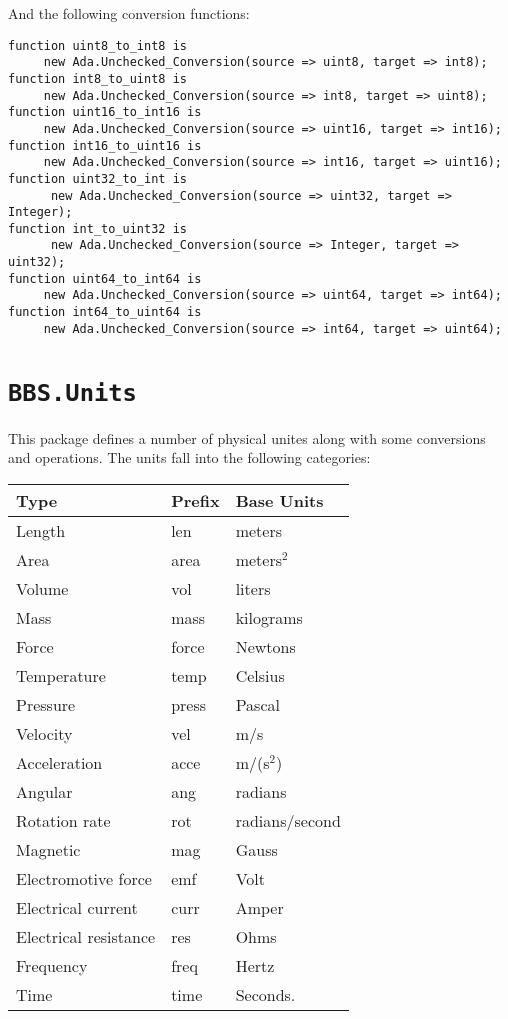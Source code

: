 \documentclass[10pt, openany]{book}
\newcommand{\package}[1]{\texttt{#1}}
\begin{document}
And the following conversion functions:
\begin{lstlisting}
function uint8_to_int8 is
     new Ada.Unchecked_Conversion(source => uint8, target => int8);
function int8_to_uint8 is
     new Ada.Unchecked_Conversion(source => int8, target => uint8);
function uint16_to_int16 is
     new Ada.Unchecked_Conversion(source => uint16, target => int16);
function int16_to_uint16 is
     new Ada.Unchecked_Conversion(source => int16, target => uint16);
function uint32_to_int is
      new Ada.Unchecked_Conversion(source => uint32, target => Integer);
function int_to_uint32 is
      new Ada.Unchecked_Conversion(source => Integer, target => uint32);
function uint64_to_int64 is
     new Ada.Unchecked_Conversion(source => uint64, target => int64);
function int64_to_uint64 is
     new Ada.Unchecked_Conversion(source => int64, target => uint64);
\end{lstlisting}

\section{\package{BBS.Units}}
This package defines a number of physical unites along with some conversions and operations.  The units fall into the following categories:

\begin{center}
\begin{tabular}{|l|l|l|}
\hline
Type & Prefix & Base Units\\
\hline
Length &  len & meters\\
Area & area & meters$^2$\\
Volume & vol & liters\\
Mass &  mass & kilograms\\
Force & force & Newtons\\
Temperature & temp & Celsius\\
Pressure & press & Pascal\\
Velocity & vel & m/s\\
Acceleration & acce & m/(s$^2$)\\
Angular & ang & radians\\
Rotation rate & rot & radians/second\\
Magnetic & mag & Gauss\\
Electromotive force & emf & Volt\\
Electrical current & curr & Amper\\
Electrical resistance & res & Ohms\\
Frequency & freq & Hertz\\
Time & time & Seconds.\\
\hline
\end{tabular}
\end{center}
\end{document}
